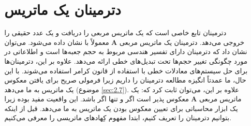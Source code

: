 \section{\textbf{دترمینان یک ماتریس}}
\label{sec:2.5}
{
    \Large
    \begin{spacing}{1.3}
        دترمینان تابع خاصی است که یک ماتریس مربعی را دریافت و یک عدد حقیقی را خروجی می‌دهد.
        دترمینان یک ماتریس مربعی $\textbf{A}$ معمولاً با  نشان داده می‌شود.
        می‌توان نشان داد که دترمینان دارای تفسیر هندسی مربوط به حجم جعبه‌ها است و اطلاعاتی در مورد چگونگی تغییر حجم‌ها تحت تبدیل‌های خطی ارائه می‌دهد.
        علاوه بر این، دترمینان‌ها برای حل سیستم‌های معادلات خطی با استفاده از قانون کرامر استفاده می‌شوند.
        با این حال، ما عمدتاً انگیزه مطالعه دترمینان را داریم زیرا فرمولی صریح برای یافتن معکوس یک ماتریس به ما می‌دهد (موضوع \ref{sec:2.7}).
        علاوه بر این، می‌توان ثابت کرد که: یک ماتریس مربعی $\textbf{A}$ معکوس پذیر است اگر و تنها اگر  باشد.
        این واقعیت مفید بوده زیرا یک ابزار محاسباتی برای تعیین معکوس بودن یک ماتریس به ما می‌دهد.
        قبل از اینکه بتوانیم دترمینان را تعریف کنیم، ابتدا مفهوم کِهادهای ماتریسی را معرفی می‌کنیم.
    \end{spacing}
}

